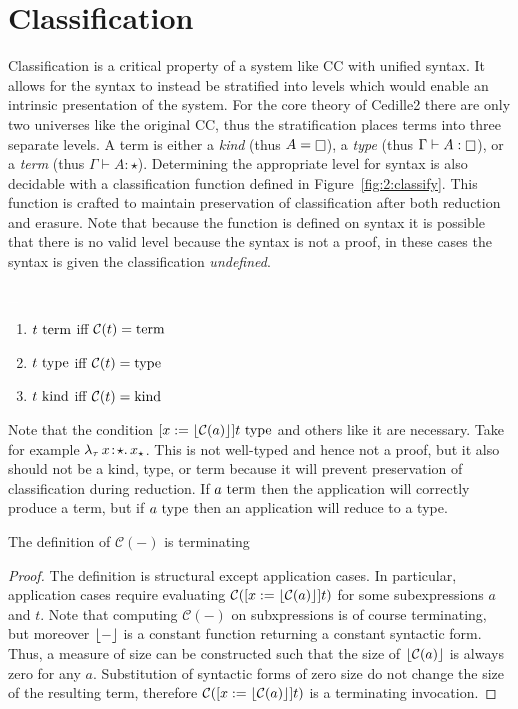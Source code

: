 \section{Classification}



Classification is a critical property of a system like CC with unified syntax.
It allows for the syntax to instead be stratified into levels which would enable an intrinsic presentation of the system.
For the core theory of Cedille2 there are only two universes like the original CC, thus the stratification places terms into three separate levels.
A term is either a \textit{kind} (thus $A = \kind$), a \textit{type} (thus $\Gamma \vdash A : \kind$), or a \textit{term} (thus $\Gamma \vdash A : \star$).
Determining the appropriate level for syntax is also decidable with a classification function defined in Figure~\ref{fig:2:classify}.
This function is crafted to maintain preservation of classification after both reduction and erasure.
Note that because the function is defined on syntax it is possible that there is no valid level because the syntax is not a proof, in these cases the syntax is given the classification \textit{undefined}.

\begin{definition}
    \textcolor{white}{\_}
    \begin{enumerate}
        \item $t~\textnormal{term}$ iff $\mathcal{C}(t) =\!\!~\textnormal{term}$
        \item $t~\textnormal{type}$ iff $\mathcal{C}(t) =\!\!~\textnormal{type}$
        \item $t~\textnormal{kind}$ iff $\mathcal{C}(t) =\!\!~\textnormal{kind}$
    \end{enumerate}
\end{definition}

Note that the condition $[x := \lfloor \mathcal{C}(a) \rfloor]t~\textnormal{type}$ and others like it are necessary.
Take for example ${\lambda_\tau}\, x\! : \! \star.\, x_\star$.
This is not well-typed and hence not a proof, but it also should not be a kind, type, or term because it will prevent preservation of classification during reduction.
If $a~\textnormal{term}$ then the application will correctly produce a term, but if $a~\textnormal{type}$ then an application will reduce to a type.

\begin{lemma}
    The definition of $\mathcal{C}(-)$ is terminating
\end{lemma}
\begin{proof}
    The definition is structural except application cases.
    In particular, application cases require evaluating $\mathcal{C}([x := \lfloor \mathcal{C}(a) \rfloor]t)$ for some subexpressions $a$ and $t$.
    Note that computing $\mathcal{C}(-)$ on subxpressions is of course terminating, but moreover $\lfloor - \rfloor$ is a constant function returning a constant syntactic form.
    Thus, a measure of size can be constructed such that the size of $\lfloor \mathcal{C}(a) \rfloor$ is always zero for any $a$.
    Substitution of syntactic forms of zero size do not change the size of the resulting term, therefore $\mathcal{C}([x := \lfloor \mathcal{C}(a) \rfloor]t)$ is a terminating invocation.
\end{proof}

